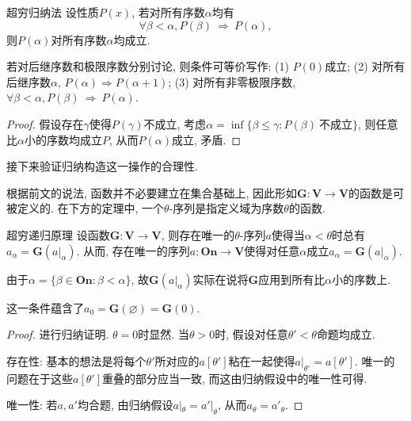 \begin{theorem}{超穷归纳法}
	设性质$P(x)$, 若对所有序数$\alpha$均有$$\forall \beta < \alpha , P(\beta) ~ \Rightarrow ~ P(\alpha),$$
	则$P(\alpha)$对所有序数$\alpha$均成立. 
\end{theorem}
\begin{remark}
	若对后继序数和极限序数分别讨论, 则条件可等价写作: (1) $P(0)$成立; (2) 对所有后继序数$\alpha$, $P(\alpha )\Rightarrow P(\alpha +1)$; (3) 对所有非零极限序数, $\forall \beta < \alpha , P(\beta) ~ \Rightarrow ~ P(\alpha)$. 
\end{remark}
\begin{proof}
	假设存在$\gamma$使得$P(\gamma)$不成立, 考虑$\alpha = \inf \{ \beta \leq \gamma : P(\beta)~\textit{不成立} \}$, 则任意比$\alpha$小的序数均成立$P$, 从而$P(\alpha)$成立, 矛盾. 
\end{proof}

接下来验证归纳构造这一操作的合理性. 

根据前文的说法, 函数并不必要建立在集合基础上, 因此形如$\mathbf{G}:\mathbf{V} \to \mathbf{V}$的函数是可被定义的. 在下方的定理中, 一个$\theta$-序列是指定义域为序数$\theta$的函数. 

\begin{corollary}{超穷递归原理}
	设函数$\mathbf{G}:\mathbf{V} \to \mathbf{V}$, 则存在唯一的$\theta$-序列$a$使得当$\alpha < \theta$时总有$a_{\alpha} = \mathbf{G}(a|_{\alpha})$. 从而, 存在唯一的序列$a:\mathbf{On} \to \mathbf{V}$使得对任意$\alpha$成立$a_{\alpha} = \mathbf{G}(a|_{\alpha})$. 
\end{corollary}
\begin{remark}
	由于$\alpha = \{ \beta \in \mathbf{On}:\beta < \alpha \}$, 故$\mathbf{G}(a|_{\alpha})$实际在说将$\mathbf{G}$应用到所有比$\alpha$小的序数上. 
\end{remark}
\begin{remark}
	这一条件蕴含了$a_0=\mathbf{G}(\varnothing) = \mathbf{G}(0)$. 
\end{remark}
\begin{proof}
	进行归纳证明. $\theta =0$时显然. 当$\theta >0$时, 假设对任意$\theta ' < \theta$命题均成立. 
	
	存在性: 基本的想法是将每个$\theta '$所对应的$a[\theta ']$粘在一起使得$a|_{\theta '} = a[\theta ']$. 唯一的问题在于这些$a[\theta ']$重叠的部分应当一致, 而这由归纳假设中的唯一性可得. 
	
	唯一性: 若$a,a'$均合题, 由归纳假设$a|_{\theta}=a'|_{\theta}$, 从而$a_{\theta} = a'_{\theta}$. 
\end{proof}

